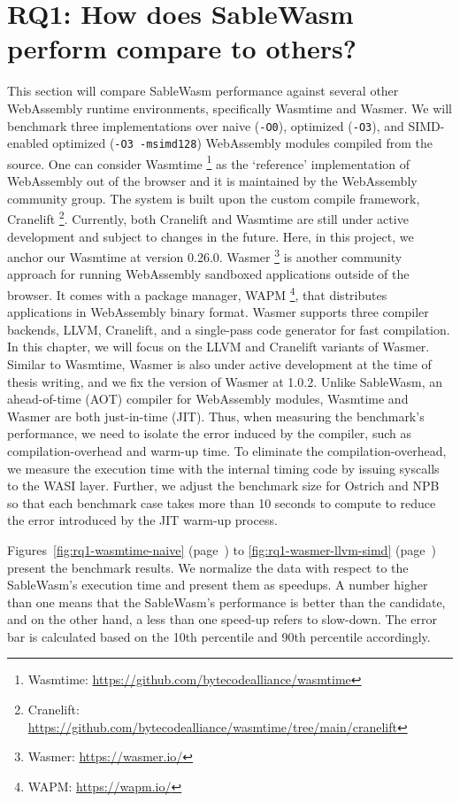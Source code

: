 \section[RQ1: How does SableWasm perform compare to others?]{
  {\large RQ1: How does SableWasm perform compare to others?}}

This section will compare SableWasm performance against several other
WebAssembly runtime environments, specifically Wasmtime and Wasmer. We will
benchmark three implementations over naive (\texttt{-O0}),
optimized (\texttt{-O3}), and SIMD-enabled optimized (\texttt{-O3 -msimd128})
WebAssembly modules compiled from the source. One can consider Wasmtime
\footnote{Wasmtime: \url{https://github.com/bytecodealliance/wasmtime}} as
the `reference' implementation of WebAssembly out of the browser and it is
maintained by the WebAssembly community group. The system is built upon the
custom compile framework, Cranelift \footnote{Cranelift:
    \url{https://github.com/bytecodealliance/wasmtime/tree/main/cranelift}}.
Currently, both Cranelift and Wasmtime are still under active development and
subject to changes in the future. Here, in this project, we anchor our
Wasmtime at version 0.26.0. Wasmer \footnote{Wasmer: \url{https://wasmer.io/}}
is another community approach for running WebAssembly sandboxed applications
outside of the browser. It comes with a package manager, WAPM
\footnote{WAPM: \url{https://wapm.io/}}, that distributes applications in
WebAssembly binary format. Wasmer supports three compiler backends, LLVM,
Cranelift, and a single-pass code generator for fast compilation. In this
chapter, we will focus on the LLVM and Cranelift variants of Wasmer. Similar to
Wasmtime, Wasmer is also under active development at the time of thesis writing,
and we fix the version of Wasmer at 1.0.2. Unlike SableWasm, an
ahead-of-time (AOT) compiler for WebAssembly modules, Wasmtime and Wasmer are
both just-in-time (JIT). Thus, when measuring the benchmark's performance, we
need to isolate the error induced by the compiler, such as compilation-overhead
and warm-up time. To eliminate the compilation-overhead, we measure the
execution time with the internal timing code by issuing syscalls to the WASI
layer. Further, we adjust the benchmark size for Ostrich and NPB so that each
benchmark case takes more than 10 seconds to compute to reduce the error
introduced by the JIT warm-up process.

Figures~\ref{fig:rq1-wasmtime-naive} (page~\pageref{fig:rq1-wasmtime-naive}) to
\ref{fig:rq1-wasmer-llvm-simd} (page~\pageref{fig:rq1-wasmer-llvm-simd}) present
the benchmark results. We normalize the data with respect to the SableWasm's
execution time and present them as speedups. A number higher than one means
that the SableWasm's performance is better than the candidate, and on the
other hand, a less than one speed-up refers to slow-down. The error bar is
calculated based on the 10th percentile and 90th percentile accordingly.

